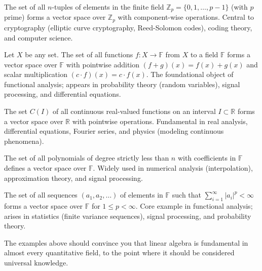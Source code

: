   \begin{example}[$\mathbb{Z}_p^n$]
    The set of all $n$-tuples of elements in the finite field $\mathbb{Z}_p = \{0, 1, \dots, p-1\}$ (with $p$ prime) forms a vector space over $\mathbb{Z}_p$ with component-wise operations. Central to cryptography (elliptic curve cryptography, Reed-Solomon codes), coding theory, and computer science.
  \end{example}

  \begin{example}
    Let $X$ be any set. The set of all functions $f: X \to \mathbb{F}$ from $X$ to a field $\mathbb{F}$ forms a vector space over $\mathbb{F}$ with pointwise addition $(f+g)(x) = f(x) + g(x)$ and scalar multiplication $(c \cdot f)(x) = c \cdot f(x)$. The foundational object of functional analysis; appears in probability theory (random variables), signal processing, and differential equations.
  \end{example}

  \begin{example}
    The set $C(I)$ of all continuous real-valued functions on an interval $I \subset \mathbb{R}$ forms a vector space over $\mathbb{R}$ with pointwise operations. Fundamental in real analysis, differential equations, Fourier series, and physics (modeling continuous phenomena).
  \end{example}

  \begin{example}
    The set of all polynomials of degree strictly less than $n$ with coefficients in $\mathbb{F}$ defines a vector space over $\mathbb{F}$. Widely used in numerical analysis (interpolation), approximation theory, and signal processing.
  \end{example}

  \begin{example}
    The set of all sequences $(a_1, a_2, \dots)$ of elements in $\mathbb{F}$ such that $\sum_{i=1}^\infty |a_i|^p < \infty$ forms a vector space over $\mathbb{F}$ for $1 \leq p < \infty$. Core example in functional analysis; arises in statistics (finite variance sequences), signal processing, and probability theory.
  \end{example}

  The examples above should convince you that linear algebra is fundamental in almost every quantitative field, to the point where it should be considered universal knowledge.  

